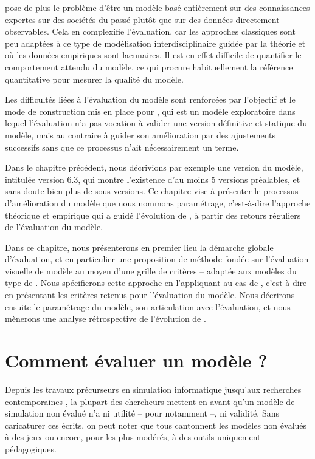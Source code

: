 \simfeodal{} pose de plus le problème d'être un modèle basé entièrement sur des connaissances expertes sur des sociétés du passé plutôt que sur des données directement observables.
Cela en complexifie l'évaluation, car les approches classiques sont peu adaptées à ce type de modélisation interdisciplinaire guidée par la théorie et où les données empiriques sont lacunaires.
Il est en effet difficile de quantifier le comportement attendu du modèle, ce qui procure habituellement la référence quantitative pour mesurer la qualité du modèle.

Les difficultés liées à l'évaluation du modèle sont renforcées par l'objectif et le mode de construction mis en place pour \simfeodal{}, qui est un modèle exploratoire dans lequel l'évaluation n'a pas vocation à valider une version \og définitive\fg{} et statique du modèle, mais au contraire à guider son amélioration par des ajustements successifs sans que ce processus n'ait nécessairement un terme.

Dans le chapitre précédent, nous décrivions par exemple une \og version\fg{} du modèle, intitulée \og version 6.3\fg{}, qui montre l'existence d'au moins 5 versions préalables, et sans doute bien plus de \og sous-versions\fg{}.
Ce chapitre vise à présenter le processus d'amélioration du modèle que nous nommons \og paramétrage\fg{}, c'est-à-dire l'approche théorique et empirique qui a guidé l'évolution de \simfeodal{}, à partir des retours réguliers de l'évaluation du modèle.

Dans ce chapitre, nous présenterons en premier lieu la démarche globale d'évaluation, et en particulier une proposition de méthode fondée sur l'\og{}évaluation visuelle\fg{} de modèle au moyen d'une grille de critères -- adaptée aux modèles du type de \simfeodal{}.
Nous spécifierons cette approche en l'appliquant au cas de \simfeodal{}, c'est-à-dire en présentant les critères retenus pour l'évaluation du modèle.
Nous décrirons ensuite le paramétrage du modèle, son articulation avec l'évaluation, et nous mènerons une analyse rétrospective de l'évolution de \simfeodal{}.

\section{Comment évaluer un modèle ?}\label{sec:evaluer-modele}

Depuis les travaux précurseurs en simulation informatique \autocite{naylor_verification_1967,hermann_validation_1967,sargent_validation_1979} jusqu'aux recherches contemporaines \autocite{amblard_evaluation_2006,banos_pour_2013,augusiak_merging_2014, rey-coyrehourcq_plateforme_2015}, la plupart des chercheurs mettent en avant qu'un modèle de simulation non évalué n'a ni utilité -- pour \cite{naylor_verification_1967} notamment --, ni validité.
Sans caricaturer ces écrits, on peut noter que tous cantonnent les modèles non évalués à des \og jeux\fg{} ou encore, pour les plus modérés, à des outils uniquement pédagogiques.

